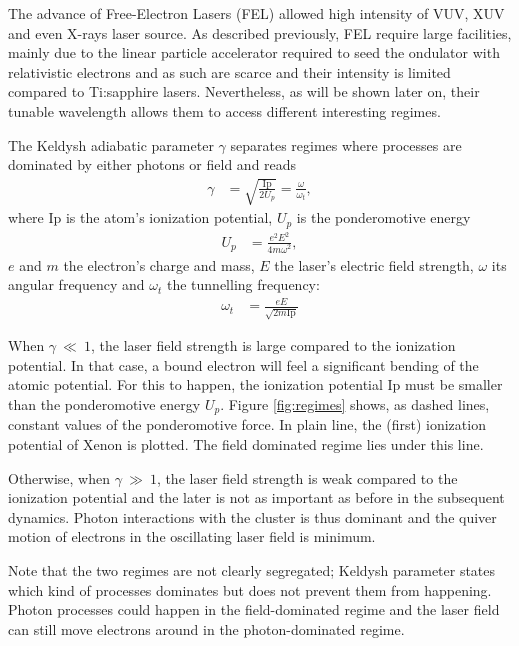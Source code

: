The advance of Free-Electron Lasers (FEL) allowed high intensity of VUV, XUV and
even X-rays laser source. As described previously, FEL require large facilities,
mainly due to the linear particle accelerator required to seed the ondulator
with relativistic electrons and as such are scarce and their intensity is limited
compared to Ti:sapphire lasers. Nevertheless, as will be shown later on, their
tunable wavelength allows them to access different interesting regimes.

The Keldysh adiabatic parameter $\gamma$ separates regimes where processes are
dominated by either photons or field\cite{Schlessinger1979,Long2010} and reads
\begin{align}
\gamma & = \sqrt{ \frac{\textrm{Ip}}{2 U_p} } = \frac{\omega}{\omega_t},
\end{align}
where Ip is the atom's ionization potential, $U_p$ is the ponderomotive energy
\begin{align}
U_p & = \frac{e^2 E^2}{4 m \omega^2},
\end{align}
$e$ and $m$ the electron's charge and mass, $E$ the laser's electric field
strength, $\omega$ its angular frequency and $\omega_t$ the tunnelling
frequency:
\begin{align}
\omega_t & = \frac{e E}{\sqrt{2 m \textrm{Ip}}}
\end{align}


When $\gamma~\ll~1$, the laser field strength is large compared to the ionization
potential. In that case, a bound electron will feel a significant bending of the
atomic potential. For this to happen, the ionization potential Ip must be
smaller than the ponderomotive energy $U_p$. Figure \ref{fig:regimes} shows,
as dashed lines, constant values of the ponderomotive force. In plain line,
the (first) ionization potential of Xenon is plotted. The field dominated regime
lies under this line.

Otherwise, when $\gamma~\gg~1$, the laser field strength is weak compared to
the ionization potential and the later is not as important as before in the
subsequent dynamics. Photon interactions with the cluster is thus dominant and
the quiver motion of electrons in the oscillating laser field is minimum.

Note that the two regimes are not clearly segregated; Keldysh parameter states
which kind of processes dominates but does not prevent them from happening.
Photon processes could happen in the field-dominated regime and the laser field
can still move electrons around in the photon-dominated regime.

